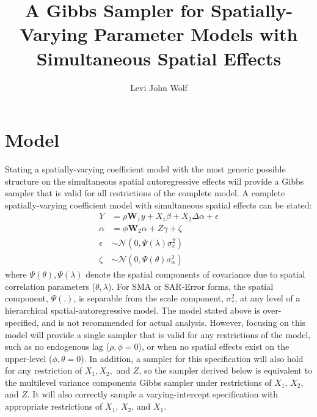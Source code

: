 \documentclass[11pt]{article}
\title{A Gibbs Sampler for Spatially-Varying Parameter Models with Simultaneous Spatial Effects}
\author{Levi John Wolf}
\begin{document}
\maketitle
\doublespacing

\section{Model}
Stating a spatially-varying coefficient model with the most generic possible structure on the simultaneous spatial autoregressive effects will provide a Gibbs sampler that is valid for all restrictions of the complete model. A complete spatially-varying coefficient model with simultaneous spatial effects can be stated:
\begin{equation}
\begin{split}
Y &= \rho \mathbf{W}_1 y + X_1\beta + X_2\Delta\alpha + \epsilon \\
\alpha &= \phi \mathbf{W}_2 \alpha + Z\gamma + \zeta \\
\epsilon &\sim \mathcal{N}(0, \Psi(\lambda)\sigma^2_e) \\
\zeta &\sim \mathcal{N}(0, \Psi(\theta)\sigma^2_\alpha)
\end{split}
\end{equation}
where $\Psi(\theta), \Psi(\lambda)$ denote the spatial components of covariance due to spatial correlation parameters ($\theta,\lambda$). For SMA or SAR-Error forms, the spatial component, $\Psi(.)$, is separable from the scale component, $\sigma^2_*$, at any level of a hierarchical spatial-autoregressive model. The model stated above is over-specified, and is not recommended for actual analysis. However, focusing on this model will provide a single sampler that is valid for any restrictions of the model, such as no endogenous lag ($\rho, \phi = 0$), or when no spatial effects exist on the upper-level ($\phi, \theta = 0$). In addition, a sampler for this specification will also hold for any restriction of $X_1, X_2,$ and $Z$, so the sampler derived below is equivalent to the multilevel variance components Gibbs sampler under restrictions of $X_1$, $X_2$, and $Z$. It will also correctly sample a varying-intercept specification with appropriate restrictions of $X_1$, $X_2$, and $X_1$.
\end{document}
